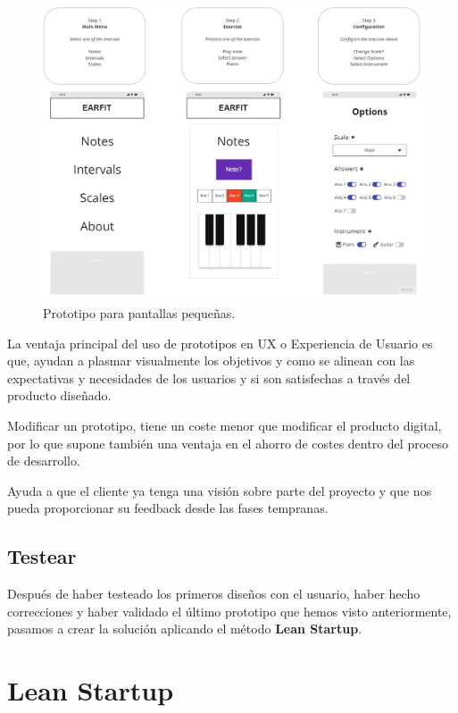 \documentclass[12pt,twoside,titlepage]{report}
\begin{document}
\begin{figure}[H]
        \centering
        \includegraphics[scale=0.33]{Design Thinking/Prototipo/Small/Prototipo}
        \caption{Prototipo para pantallas pequeñas.}
        \label{fig:PrototipoSmall}
    \end{figure}

La ventaja principal del uso de prototipos en UX o Experiencia de Usuario es que, ayudan a plasmar visualmente los objetivos y como se alinean con las expectativas y necesidades de los usuarios y si son satisfechas a través del producto diseñado.

Modificar un prototipo, tiene un coste menor que modificar el producto digital, por lo que supone también una ventaja en el ahorro de costes dentro del proceso de desarrollo.

Ayuda a que el cliente ya tenga una visión sobre parte del proyecto y que nos pueda proporcionar su feedback desde las fases tempranas.

\subsection{Testear}

Después de haber testeado los primeros diseños con el usuario, haber hecho correcciones y haber validado el último prototipo que hemos visto anteriormente, pasamos a crear la solución aplicando el método \textbf{Lean Startup}.

\section{Lean Startup}
\end{document}
